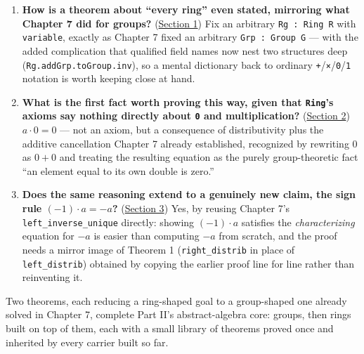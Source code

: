 \begin{enumerate}
\def\labelenumi{\arabic{enumi}.}
\tightlist
\item
  \textbf{How is a theorem about ``every ring'' even stated, mirroring what Chapter 7 did for groups?} (\hyperref[sec:09-ring-theorems:01-setup:1]{Section 1}) Fix an arbitrary \texttt{Rg : Ring R} with \texttt{variable}, exactly as Chapter 7 fixed an arbitrary \texttt{Grp : Group G} --- with the added complication that qualified field names now nest two structures deep (\texttt{Rg.addGrp.toGroup.inv}), so a mental dictionary back to ordinary \texttt{+}/\texttt{×}/\texttt{0}/\texttt{1} notation is worth keeping close at hand.
\item
  \textbf{What is the first fact worth proving this way, given that \texttt{Ring}'s axioms say nothing directly about \texttt{0} and multiplication?} (\hyperref[sec:09-ring-theorems:02-theorem-1:1]{Section 2}) \(a \cdot 0 = 0\) --- not an axiom, but a consequence of distributivity plus the additive cancellation Chapter 7 already established, recognized by rewriting \(0\) as \(0+0\) and treating the resulting equation as the purely group-theoretic fact ``an element equal to its own double is zero.''
\item
  \textbf{Does the same reasoning extend to a genuinely new claim, the sign rule \((-1)\cdot a = -a\)?} (\hyperref[sec:09-ring-theorems:03-theorem-2:1]{Section 3}) Yes, by reusing Chapter 7's \texttt{left\_\allowbreak{}inverse\_\allowbreak{}unique} directly: showing \((-1)\cdot
  a\) satisfies the \emph{characterizing} equation for \(-a\) is easier than computing \(-a\) from scratch, and the proof needs a mirror image of Theorem 1 (\texttt{right\_\allowbreak{}distrib} in place of \texttt{left\_\allowbreak{}distrib}) obtained by copying the earlier proof line for line rather than reinventing it.
\end{enumerate}

Two theorems, each reducing a ring-shaped goal to a group-shaped one already solved in Chapter 7, complete Part II's abstract-algebra core: groups, then rings built on top of them, each with a small library of theorems proved once and inherited by every carrier built so far.







